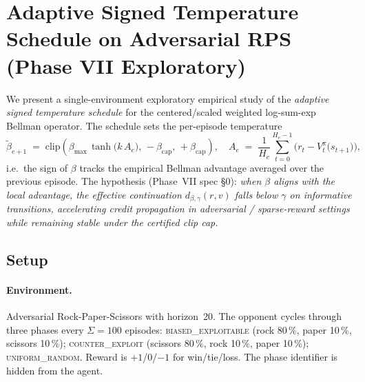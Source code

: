 %
%

\section{Adaptive Signed Temperature Schedule on Adversarial RPS (Phase VII Exploratory)}
\label{app:phase_vii_adaptive_beta}

We present a single-environment exploratory empirical study of the
\emph{adaptive signed temperature schedule} for the centered/scaled
weighted log-sum-exp Bellman operator.  The schedule sets the
per-episode temperature
\[
\tilde\beta_{e+1} \;=\; \mathrm{clip}\!\left(\beta_{\max}\,\tanh\!\bigl(k\,A_e\bigr),\, -\beta_{\mathrm{cap}},\, +\beta_{\mathrm{cap}}\right),
\quad
A_e \;=\; \frac{1}{H_e}\sum_{t=0}^{H_e-1}\bigl(r_t - V^{\pi}_t\bigl(s_{t+1}\bigr)\bigr),
\]
i.e.\ the sign of $\beta$ tracks the empirical Bellman advantage averaged
over the previous episode.  The hypothesis (Phase~VII spec §0):
\emph{when $\beta$ aligns with the local advantage, the effective
continuation $d_{\beta,\gamma}(r,v)$ falls below $\gamma$ on informative
transitions, accelerating credit propagation in adversarial / sparse-reward
settings while remaining stable under the certified clip cap.}

\subsection{Setup}

\paragraph{Environment.}  Adversarial Rock-Paper-Scissors with horizon~20.
The opponent cycles through three phases every $\Sigma=100$ episodes:
\textsc{biased\_exploitable} (rock 80\,\%, paper 10\,\%, scissors 10\,\%);
\textsc{counter\_exploit} (scissors 80\,\%, rock 10\,\%, paper 10\,\%);
\textsc{uniform\_random}.  Reward is $+1$/$0$/$-1$ for win/tie/loss.  The
phase identifier is hidden from the agent.

